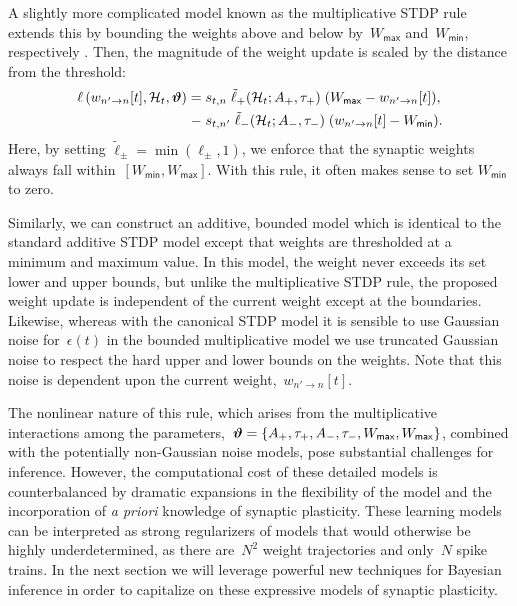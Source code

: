 A slightly more complicated model known as the multiplicative STDP
rule extends this by bounding the weights above and below
by~$W_{\mathsf{max}}$ and~$W_{\mathsf{min}}$, respectively
\cite{Morrison-2008}. Then, the magnitude of the weight update is
scaled by the distance from the threshold:
\begin{align}
 \label{eqn:MultSTDP}
 \ell\left(w_{n' \to n}[t], \mathcal{H}_t, \boldsymbol{\vartheta} \right) = 
 \;& s_{t,n} \;  \tilde\ell_+(\mathcal{H}_t; A_+, \tau_+) \; (W_{\mathsf{max}}-w_{n'\to n}[t]), \nonumber \\
  \;-\; &s_{t,n'}\;  \tilde\ell_-(\mathcal{H}_t; A_-, \tau_-) \; (w_{n'\to n}[t]-W_{\mathsf{min}}).
\end{align}
Here, by setting ${\tilde\ell_\pm = \min(\ell_\pm,1)}$, we enforce
that the synaptic weights always fall
within~${[W_{\mathsf{min}}, W_{\mathsf{max}}]}$. With this rule, it
often makes sense to set $W_{\mathsf{min}}$ to zero.

Similarly, we can construct an additive, bounded model which is
identical to the standard additive STDP model except that weights are
thresholded at a minimum and maximum value. In this model, the weight
never exceeds its set lower and upper bounds, but unlike the
multiplicative STDP rule, the proposed weight update is independent of
the current weight except at the boundaries. Likewise, whereas with
the canonical STDP model it is sensible to use Gaussian noise
for~$\epsilon(t)$ in the bounded multiplicative model we use truncated
Gaussian noise to respect the hard upper and lower bounds on the
weights.  Note that this noise is dependent upon the current
weight,~$w_{n'\to n}[t]$.

The nonlinear nature of this rule, which arises from the
multiplicative interactions among the parameters,~${\boldsymbol{\vartheta} =
  \{A_+,\tau_+,A_-,\tau_-,W_{\mathsf{max}}, W_{\mathsf{max}}\}}$,
combined with the potentially non-Gaussian noise models, pose
substantial challenges for inference. However, the computational cost
of these detailed models is counterbalanced by dramatic expansions in
the flexibility of the model and the incorporation of \emph{a priori}
knowledge of synaptic plasticity. These learning models can be
interpreted as strong regularizers of models that would otherwise be
highly underdetermined, as there are~$N^2$ weight trajectories and
only~$N$ spike trains. In the next section we will leverage powerful
new techniques for Bayesian inference in order to capitalize on these
expressive models of synaptic plasticity.

